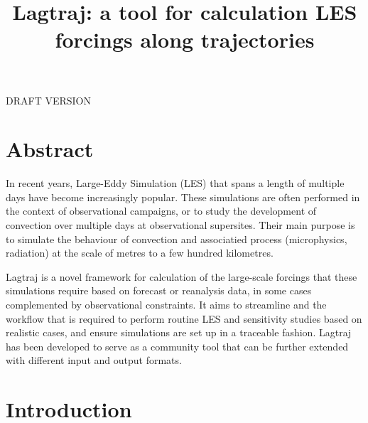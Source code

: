 \documentclass[a4paper,11pt]{article}
\title{Lagtraj: a tool for calculation LES forcings along trajectories}
\begin{document}
\maketitle

DRAFT VERSION

\section*{Abstract}

In recent years, Large-Eddy Simulation (LES) that spans a length of
multiple days have become increasingly popular. These simulations are
often performed in the context of observational campaigns, or to study
the development of convection over multiple days at observational
supersites. Their main purpose is to simulate the behaviour of
convection and associatied process (microphysics, radiation) at the
scale of metres to a few hundred kilometres.


Lagtraj is a novel framework for calculation of the large-scale
forcings that these simulations require based on forecast or reanalysis
data, in some cases complemented by observational constraints. It aims
to streamline and the workflow that is required to perform routine LES
and sensitivity studies based on realistic cases, and ensure
simulations are set up in a traceable fashion. Lagtraj has been
developed to serve as a community tool that can be further extended
with different input and output formats.

\section{Introduction}
\end{document}
